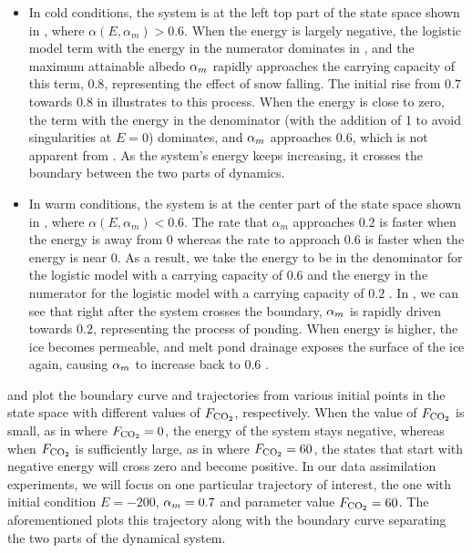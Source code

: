 \begin{itemize}
    \item In cold conditions, the system is at the left top part of the state space shown in , where $\alpha(E,\alpha_m) > 0.6$. When the energy is largely negative, the logistic model term with the energy in the numerator dominates in , and the maximum attainable albedo $\alpha_m$ rapidly approaches the carrying capacity of this term, $0.8$, representing the effect of snow falling. The initial rise from $0.7$ towards $0.8$ in  illustrates to this process. When the energy is close to zero, the term with the energy in the denominator (with the addition of 1 to avoid singularities at $E=0$) dominates, and $\alpha_m$ approaches $0.6$, which is not apparent from . As the system's energy keeps increasing, it crosses the boundary between the two parts of dynamics.
    \item In warm conditions, the system is at the center part of the state space shown in , where $\alpha(E,\alpha_m) < 0.6$. The rate that $\alpha_m$ approaches $0.2$ is faster when the energy is away from $0$ whereas the rate to approach $0.6$ is faster when the energy is near $0$. As a result, we take the energy to be in the denominator for the logistic model with a carrying capacity of $0.6$ and the energy in the numerator for the logistic model with a carrying capacity of $0.2$ . In , we can see that right after the system crosses the boundary, $\alpha_m$ is rapidly driven towards $0.2$, representing the process of ponding. When energy is higher, the ice becomes permeable, and melt pond drainage exposes the surface of the ice again, causing $\alpha_m$ to increase back to $0.6$ .
\end{itemize}

\par {} and  plot the boundary curve and trajectories from various initial points in the state space with different values of $F_{\text{CO}_2}$, respectively. When the value of $F_{\text{CO}_2}$ is small, as in  where $F_{\text{CO}_2}=0$, the energy of the system stays negative, whereas when $F_{\text{CO}_2}$ is sufficiently large, as in  where $F_{\text{CO}_2}=60$, the states that start with negative energy will cross zero and become positive. In our data assimilation experiments, we will focus on one particular trajectory of interest, the one with initial condition $E=-200$, $\alpha_m=0.7$ and parameter value $F_{\text{CO}_2}=60$. The aforementioned  plots this trajectory along with the boundary curve separating the two parts of the dynamical system.

